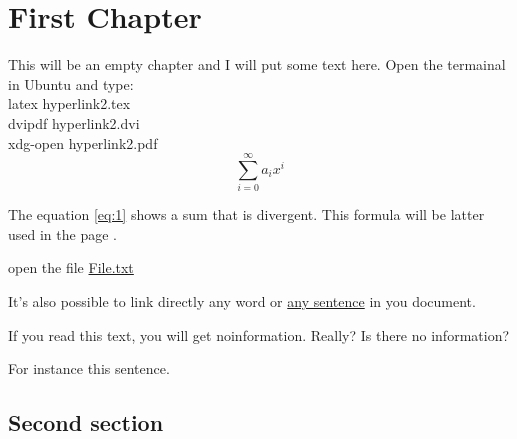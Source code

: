 \documentclass{book}
\begin{document}
\tableofcontents

\chapter{First Chapter}

This will be an empty chapter and I will put some text here.
Open the termainal in Ubuntu and type:\\
latex hyperlink2.tex\\
dvipdf hyperlink2.dvi\\
xdg-open hyperlink2.pdf\\

\begin{equation}
\label{eq:1}
\sum_{i=0}^{\infty} a_i x^i
\end{equation}

The equation \ref{eq:1} shows a sum that is divergent. This formula will be latter used in the page \pageref{second}.



open the file \href{run:./file.txt}{File.txt}

It's also possible to link directly any word or \hyperlink{thesentence}{any sentence} in you document.

If you read this text, you will get noinformation.  Really?  Is there no information?

For instance \hypertarget{thesentence}{this sentence}.



\clearpage

\section{Second section} \label{second}
\end{document}
